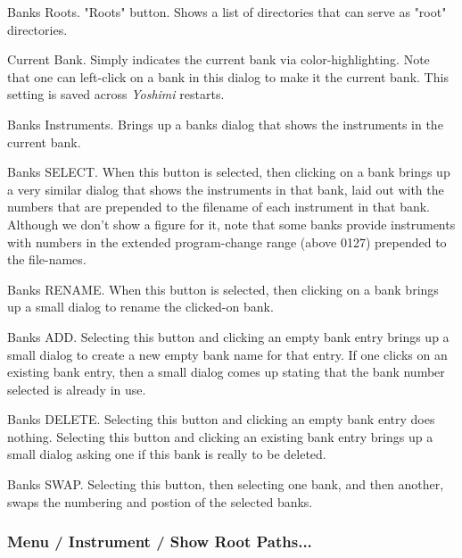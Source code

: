    \setcounter{ItemCounter}{0}      %

   Banks Roots.
   "Roots" button.
   Shows a list of directories that can serve as "root" directories.

   Current Bank.  Simply indicates the current bank via color-highlighting.
   Note that one can left-click on a bank in this dialog to make it the
   current bank.  This setting is saved across \textsl{Yoshimi} restarts.

   Banks Instruments.
   Brings up a banks dialog that shows the instruments in the current bank.

   Banks SELECT.
   When this button is selected, then clicking on a bank brings
   up a very similar dialog that shows the instruments in that bank, laid
   out with the numbers that are prepended to the filename of each
   instrument in that bank.
   Although we don't show a figure for it, note that some banks provide
   instruments with numbers in the extended program-change range (above
   0127) prepended to the file-names.

   Banks RENAME.
   When this button is selected, then clicking on a bank brings
   up a small dialog to rename the clicked-on bank.

   Banks ADD.
   Selecting this button and clicking an empty bank entry brings up a small
   dialog to create a new empty bank name for that entry.
   If one clicks on an existing bank entry, then a small dialog comes up
   stating that the bank number selected is already in use.

   Banks DELETE.
   Selecting this button and clicking an empty bank entry does nothing.
   Selecting this button and clicking an existing bank entry brings up a
   small dialog asking one if this bank is really to be deleted.

   Banks SWAP.
   Selecting this button, then selecting one bank, and then another,
   swaps the numbering and postion of the selected banks.

\subsubsection{Menu / Instrument / Show Root Paths...}
\label{subsubsec:menu_instrument_show_root_paths}

